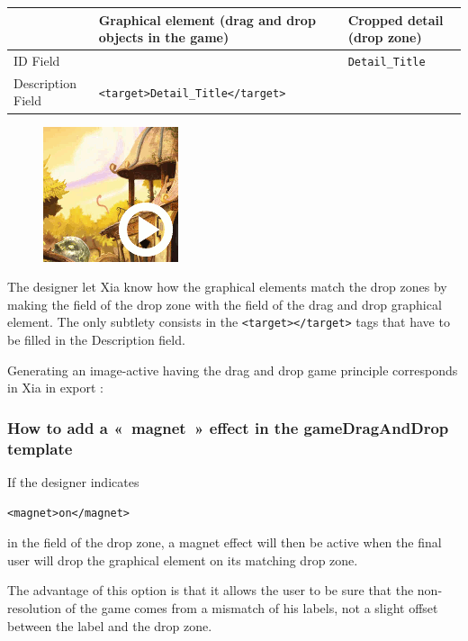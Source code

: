 \begin{center}
\begin{tabular}{|p{}|p{2.5in}|p{1.5in}|}
\hline
 & Graphical element (drag and drop objects in the game) & Cropped detail (drop zone)\\
\hline
ID Field & & \verb|Detail_Title|\\
\hline
Description Field & \verb|<target>Detail_Title</target>| & \\
\hline
\end{tabular}
\end{center}

\begin{figure}
  \centering
  \includegraphics[scale=0.7]{./images/gameDragAndDrop} 
\end{figure}


The designer let Xia know how the graphical elements match the drop zones by 
making the  field of the drop zone 
with the  field of the drag and drop graphical element. 
The only subtlety consists in the  \verb|<target></target>| tags that have to be filled in the \chemin
{Description} field.

Generating an image-active having the drag and
drop game principle corresponds in Xia in export :



\subsubsection{How to add a «~magnet~» effect in the gameDragAndDrop template}

If the designer indicates\\
\begin{center}
\verb|<magnet>on</magnet>| 
\end{center}
in the  field of the drop zone, a 
magnet effect will then be active when the final user will drop the graphical element on its matching drop zone.

The advantage of this option is that it allows the user to be sure 
that the non-resolution of the game comes from a mismatch of his 
labels, not a slight offset between the label and the drop zone.

